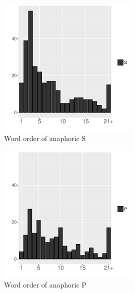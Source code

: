 \begin{figure}
	\begin{center}
	\includegraphics[width=0.6\textwidth]{figure/WOSGiven.pdf}
	\caption{Word order of anaphoric S}
	\label{WOSGivenF}
	\end{center}
\end{figure}
\begin{figure}
	\begin{center}
	\includegraphics[width=0.6\textwidth]{figure/WOPGiven.pdf}
	\caption{Word order of anaphoric P}
	\label{WOPGivenF}
	\end{center}
\end{figure}
